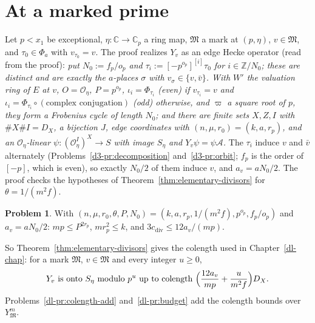 \documentclass[reqno]{amsart}
\newcounter{chap}
\numberwithin{equation}{section}
\theoremstyle{plain}
\theoremstyle{definition}
\newtheorem{problem}{Problem}[section]
\theoremstyle{remark}
\newcommand{\Z}{\mathbb{Z}}
\newcommand{\C}{\mathbb{C}}
\newcommand{\Oc}{\mathcal O}
\newcommand{\Ac}{\mathcal A}
\newcommand{\Mk}{\mathfrak M}
\newcommand{\cdiv}{c_{\mathrm{div}}}
\begin{document}
\section{At a marked prime}\label{sec:marked}

Let \(p < x_1\) be exceptional, \(\eta \colon \C \to \C_p\) a ring map, \(\Mk\) a mark at \((p, \eta)\), \(v \in \Mk\), and \(\tau_0 \in \Phi_a\) with \(v_{\tau_0} = v\).  The proof realizes \(Y_v\) as an edge Hecke operator (read from the proof): \emph{put \(N_0 := f_p/o_p\) and \(\tau_i := [-p^{o_p}]^{[i]}\tau_0\) for \(i \in \Z/N_0\); these are distinct and are exactly the \(a\)-places \(\sigma\) with \(v_\sigma \in \{v, \bar v\}\).  With \(W'\) the valuation ring of \(E\) at \(v\), \(O = \Oc_\eta\), \(P = p^{o_p}\), \(\iota_i = \Phi_{\tau_i}\) (even) if \(v_{\tau_i} = v\) and \(\iota_i = \Phi_{\tau_i} \circ (\text{complex conjugation})\) (odd) otherwise, and \(\varpi\) a square root of \(p\), they form a Frobenius cycle of length \(N_0\); and there are finite sets \(X, Z, I\) with \(\#X\#I = D_X\), a bijection \(J\), edge coordinates with \((n, \mu, r_0) = (k, a, r_p)\), and an \(\Oc_\eta\)-linear \(\psi \colon (\Oc_\eta^I)^X \to S\) with image \(S_\eta\) and \(Y_v\psi = \psi\Ac\).}  The \(\tau_i\) induce \(v\) and \(\bar v\) alternately (Problems~\ref{d3-pr:decomposition} and~\ref{d3-pr:orbit}; \(f_p\) is the order of \([-p]\), which is even), so exactly \(N_0/2\) of them induce \(v\), and \(a_v = aN_0/2\).  The proof checks the hypotheses of Theorem~\ref{thm:elementary-divisors} for \(\theta = 1/(m^2f)\).

\begin{problem}\label{pr:specialize}
With \((n, \mu, r_0, \theta, P, N_0) = (k, a, r_p, 1/(m^2f), p^{o_p}, f_p/o_p)\) and \(a_v = aN_0/2\): \(mp \le P^{2r_p}\), \(mr_p^2 \le k\), and \(3\cdiv \le 12a_v/(mp)\).
\end{problem}

So Theorem~\ref{thm:elementary-divisors} gives the colength used in Chapter~\ref{dl-chap}: for a mark \(\Mk\), \(v \in \Mk\) and every integer \(u \ge 0\),
\begin{equation}\label{eq:mark-colength}
  Y_v \text{ is onto } S_\eta \text{ modulo } p^u \text{ up to colength } \Bigl(\frac{12a_v}{mp} + \frac{u}{m^2f}\Bigr) D_X .
\end{equation}
Problems~\ref{dl-pr:colength-add} and~\ref{dl-pr:budget} add the colength bounds over \(Y_{\Mk}^m\).
\end{document}

